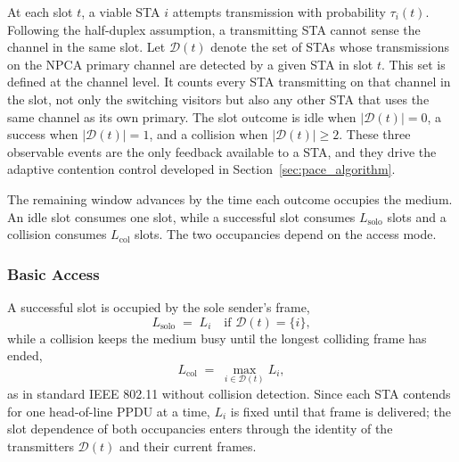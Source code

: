 \documentclass[a4paper,fleqn]{cas-dc}
\begin{document}
At each slot $t$, a viable STA $i$ attempts transmission with probability $\tau_i(t)$. Following the half-duplex assumption, a transmitting STA cannot sense the channel in the same slot. Let $\mathcal{D}(t)$ denote the set of STAs whose transmissions on the NPCA primary channel are detected by a given STA in slot $t$. This set is defined at the channel level. It counts every STA transmitting on that channel in the slot, not only the switching visitors but also any other STA that uses the same channel as its own primary. The slot outcome is idle when $|\mathcal{D}(t)|=0$, a success when $|\mathcal{D}(t)|=1$, and a collision when $|\mathcal{D}(t)|\ge 2$. These three observable events are the only feedback available to a STA, and they drive the adaptive contention control developed in Section~\ref{sec:pace_algorithm}.

The remaining window advances by the time each outcome occupies the medium. An idle slot consumes one slot, while a successful slot consumes $L_\mathrm{solo}$ slots and a collision consumes $L_\mathrm{col}$ slots. The two occupancies depend on the access mode.

\subsubsection{Basic Access}
A successful slot is occupied by the sole sender's frame,
\begin{equation}
    L_\mathrm{solo} \;=\; L_i \quad \text{if } \mathcal{D}(t)=\{i\},
    \label{eq:lsolo_basic}
\end{equation}
while a collision keeps the medium busy until the longest colliding frame has ended,
\begin{equation}
    L_\mathrm{col} \;=\; \max_{i\in\mathcal{D}(t)} L_i,
    \label{eq:lmax}
\end{equation}
as in standard IEEE 802.11 without collision detection. Since each STA contends for one head-of-line PPDU at a time, $L_i$ is fixed until that frame is delivered; the slot dependence of both occupancies enters through the identity of the transmitters $\mathcal{D}(t)$ and their current frames.
\end{document}
